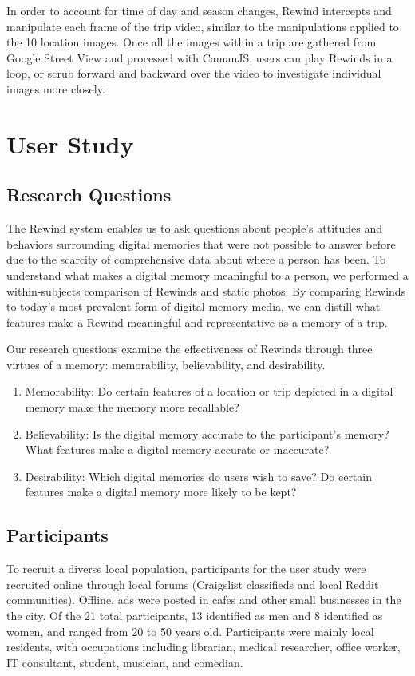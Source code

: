 \documentclass{sigchi}
\begin{document}
In order to account for time of day and season changes,
Rewind intercepts and manipulate each frame of the trip video, similar to the manipulations applied to the 10 location images. Once all the images within a trip are gathered from Google Street View and processed with CamanJS, users can play Rewinds in a loop, or scrub forward and backward over the video to investigate individual images more closely.

\section{User Study}
\subsection{Research Questions}
The Rewind system enables us to ask questions about people's attitudes and behaviors surrounding digital memories that were not possible to answer before due to the scarcity of comprehensive data about where a person has been. To understand what makes a digital memory meaningful to a person, we performed a within-subjects comparison of Rewinds and static photos. By comparing Rewinds to today's most prevalent form of digital memory media, we can distill what features make a Rewind meaningful and representative as a memory of a trip.

Our research questions examine the effectiveness of Rewinds through three virtues of a memory: memorability, believability, and desirability.

\begin{enumerate}
\item Memorability: Do certain features of a location or trip depicted in a digital memory make the memory more recallable? 
\item Believability:  Is the digital memory accurate to the participant's memory? What features make a digital memory accurate or inaccurate?
\item Desirability: Which digital memories do users wish to save? Do certain features make a digital memory more likely to be kept?
\end{enumerate}

\subsection{Participants}
To recruit a diverse local population, participants for the user study were recruited online through local forums (Craigslist classifieds and local Reddit communities). Offline, ads were posted in cafes and other small businesses in the the city. Of the 21 total participants, 13 identified as men and 8 identified as women, and ranged from 20 to 50 years old. Participants were mainly local residents, with occupations including librarian, medical researcher, office worker, IT consultant, student, musician, and comedian.
\end{document}
